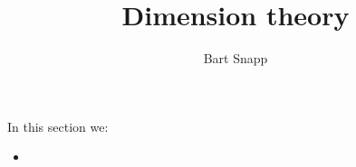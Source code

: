 \documentclass{ximera}
\author{Bart Snapp}
\title{Dimension theory}
\begin{document}
\begin{abstract}
\end{abstract}
\maketitle
In this section we:

\begin{itemize}
\item 
\end{itemize}
\end{document}
